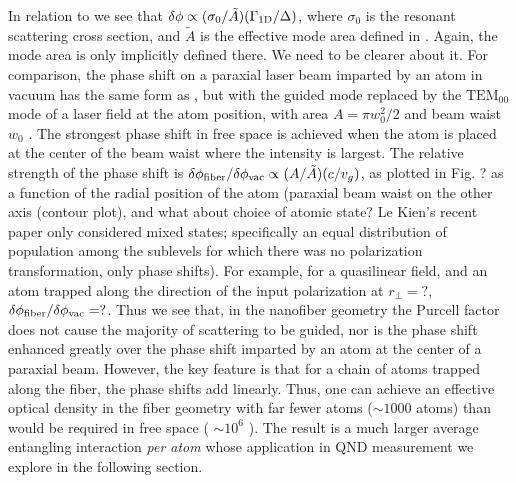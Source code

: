 \documentclass[preprint,aps,pra,onecolumn]{revtex4-1} %
\newcommand{\oneD}{{\rm 1D}}
\newcommand{\vac}{{\rm vac}}
\newcommand{\comment}[1]{{\color{Maroon} #1}}
\newcommand{\error}[1]{{\color{red} #1}}
\begin{document}
In relation to  we see that $\delta \phi \propto (\sigma_0/\tilde{A}) (\Gamma_{\oneD}/\Delta)$, where $\sigma_0$ is the resonant scattering cross section, and $\tilde{A}$ is the effective mode area defined in . \comment{Again, the mode area is only implicitly defined there.  We need to be clearer about it.}  For comparison, the phase shift on a paraxial laser beam imparted by an atom in vacuum  has the same form as , but with the guided mode replaced by the $\mathrm{TEM}_{00}$ mode of a laser field at the atom position, with area $A= \pi w_0^2/2$ and beam waist $w_0$ \cite{tanji-suzuki_chapter_2011,baragiola_three-dimensional_2014}. The strongest phase shift in free space is achieved when the atom is placed at the center of the beam waist where the intensity is largest. The relative strength of the phase shift is $\delta \phi_{\rm fiber}/\delta \phi_{\vac}\propto (A/\tilde{A}) (c/v_g)$, as plotted in Fig. ? as a function of the radial position of the atom \comment{(paraxial beam waist on the other axis (contour plot), and what about choice of atomic state?  Le Kien's recent paper only considered mixed states; specifically an equal distribution of population among the sublevels for which there was no polarization transformation, only phase shifts)}.  For example, for a quasilinear field, and an atom trapped along the direction of the input polarization  at $r_\perp = ?$, $\delta \phi_{\rm fiber}/\delta \phi_{\vac} = ?$.   Thus we see that, in the nanofiber geometry the Purcell factor does not cause the majority of scattering to be guided, nor is the phase shift enhanced greatly over the phase shift imparted by an atom at the center of a paraxial beam. However, the key feature is that for a chain of atoms trapped along the fiber, the phase shifts add linearly.  Thus, one can achieve an effective optical density in the fiber geometry with far fewer atoms ($\sim 1000$ atoms) than would be required in free space (\error{ $\sim 10^6$ }).  The result is a much larger average entangling interaction \emph{per atom} whose application in QND measurement we explore in the following section.

\end{document}
